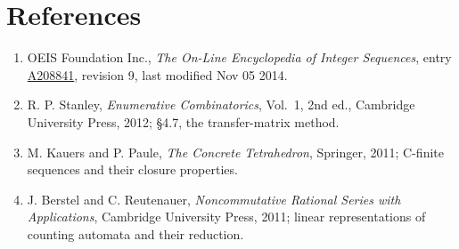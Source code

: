 \documentclass[11pt]{article}
\theoremstyle{definition}
\begin{document}
\section{References}

\begin{enumerate}

\item OEIS Foundation Inc., \emph{The On-Line Encyclopedia of Integer Sequences}, entry \href{https://oeis.org/A208841}{A208841}, revision 9, last modified Nov 05 2014.

\item R. P. Stanley, \emph{Enumerative Combinatorics}, Vol.~1, 2nd ed., Cambridge University Press, 2012; \S4.7, the transfer-matrix method.

\item M. Kauers and P. Paule, \emph{The Concrete Tetrahedron}, Springer, 2011; C-finite sequences and their closure properties.

\item J. Berstel and C. Reutenauer, \emph{Noncommutative Rational Series with Applications}, Cambridge University Press, 2011; linear representations of counting automata and their reduction.

\end{enumerate}
\end{document}
